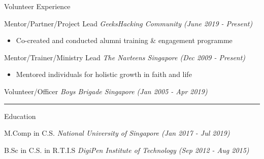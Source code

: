 \documentclass[letterpaper,11pt]{article}
\newcommand{\cvtitle}[1]{\Large\raggedright \textcolor{section_color}{#1}\\}
\newcommand{\cvhead}[1]{\large\raggedright \textcolor{subsection_color}{#1}\\}
\newcommand{\cvlist}[1]{\vspace{-12pt}\small \textcolor{item_color}{\begin{itemize}#1\end{itemize}}}
\newcommand{\cvli}[1]{\vspace{-4pt} \item{#1}}
\newcommand{\cvline}[0]{\noindent\rule{19cm}{0.4pt}}
\newcommand{\qualifier}[1]{\hfill \textsl{\footnotesize #1}}
\begin{document}
\cvtitle{Volunteer Experience}

\cvhead{Mentor/Partner/Project Lead \qualifier{GeeksHacking Community (June 2019 - Present)}}
\cvlist{
    \cvli{Co-created and conducted alumni training \& engagement programme}
}

\cvhead{Mentor/Trainer/Ministry Lead \qualifier{The Navteens Singapore (Dec 2009 - Present)}}
\cvlist{
    \cvli{Mentored individuals for holistic growth in faith and life}
}

\cvhead{Volunteer/Officer \qualifier{Boys Brigade Singapore (Jan 2005 - Apr 2019)}}

\cvline

\cvtitle{Education}

\cvhead{M.Comp in C.S. \qualifier{National University of Singapore (Jan 2017 - Jul 2019)}}

\cvhead{B.Sc in C.S. in R.T.I.S \qualifier{DigiPen Institute of Technology (Sep 2012 - Aug 2015)}}
\end{document}
